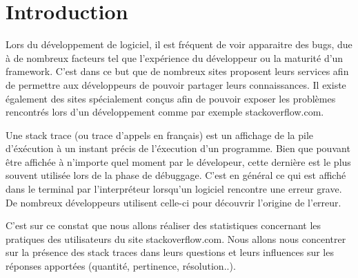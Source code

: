 \section{Introduction}
Lors du développement de logiciel, il est fréquent de voir apparaitre des bugs, due à de nombreux facteurs tel que l'expérience du développeur ou la maturité d'un framework. C'est dans ce but que de nombreux sites proposent leurs services afin de permettre aux développeurs de pouvoir partager leurs connaissances. Il existe également des sites spécialement conçus afin de pouvoir exposer les problèmes rencontrés lors d'un développement comme par exemple stackoverflow.com. 

Une stack trace (ou trace d'appels en français) est un affichage de la pile d'éxécution à un instant précis de l'éxecution d'un programme. Bien que pouvant être affichée à n'importe quel moment par le dévelopeur, cette dernière est le plus souvent utilisée lors de la phase de débuggage. C'est en général ce qui est affiché dans le terminal par l'interpréteur lorsqu'un logiciel rencontre une erreur grave. De nombreux développeurs utilisent celle-ci pour découvrir l'origine de l'erreur. 

C'est sur ce constat que nous allons réaliser des statistiques concernant les pratiques des utilisateurs du site stackoverflow.com. Nous allons nous concentrer sur la présence des stack traces dans leurs questions et leurs influences sur les réponses apportées (quantité, pertinence, résolution..).
